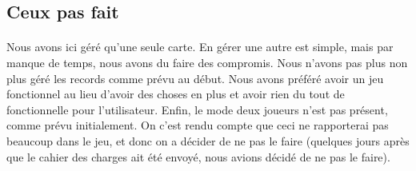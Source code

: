 \subsection{Ceux pas fait}
\paragraph{} Nous avons ici géré qu'une seule carte. En gérer une autre est simple, mais par manque de temps, nous avons du faire des compromis. Nous n'avons pas plus non plus géré les records comme prévu au début. Nous avons préféré avoir un jeu fonctionnel au lieu d'avoir des choses en plus et avoir rien du tout de fonctionnelle pour l'utilisateur. Enfin, le mode deux joueurs n'est pas présent, comme prévu initialement. On c'est rendu compte que ceci ne rapporterai pas beaucoup dans le jeu, et donc on a décider de ne pas le faire (quelques jours après que le cahier des charges ait été envoyé, nous avions décidé de ne pas le faire).
